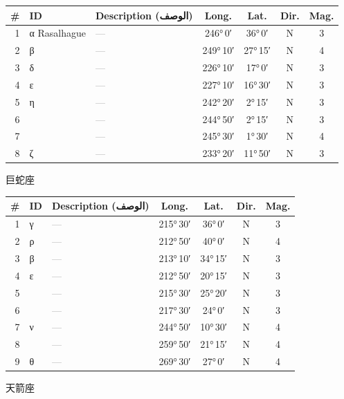 \documentclass[9pt,a4paper]{extarticle}
\newcommand{\ar}[1]{{\arabicfont\textarabic{#1}}}
\begin{document}
\begin{longtable}{r l >{\raggedright\arraybackslash}p{6.7cm} c c c c}
\toprule \# & ID & Description (\ar{الوصف}) & Long. & Lat. & Dir. & Mag.\\ \midrule\endhead
1 & α Rasalhague & \textcolor{gray}{—} & 246°\,0′ & 36°\,0′ & N & 3\\
2 & β & \textcolor{gray}{—} & 249°\,10′ & 27°\,15′ & N & 4\\
3 & δ & \textcolor{gray}{—} & 226°\,10′ & 17°\,0′ & N & 3\\
4 & ε & \textcolor{gray}{—} & 227°\,10′ & 16°\,30′ & N & 3\\
5 & η & \textcolor{gray}{—} & 242°\,20′ & 2°\,15′ & N & 3\\
6 &  & \textcolor{gray}{—} & 244°\,50′ & 2°\,15′ & N & 3\\
7 &  & \textcolor{gray}{—} & 245°\,30′ & 1°\,30′ & N & 4\\
8 & ζ & \textcolor{gray}{—} & 233°\,20′ & 11°\,50′ & N & 3\\
\bottomrule\end{longtable}
\vspace{4pt}\quad\ar{الحية}\quad 巨蛇座
\begin{longtable}{r l >{\raggedright\arraybackslash}p{6.7cm} c c c c}
\toprule \# & ID & Description (\ar{الوصف}) & Long. & Lat. & Dir. & Mag.\\ \midrule\endhead
1 & γ & \textcolor{gray}{—} & 215°\,30′ & 36°\,0′ & N & 3\\
2 & ρ & \textcolor{gray}{—} & 212°\,50′ & 40°\,0′ & N & 4\\
3 & β & \textcolor{gray}{—} & 213°\,10′ & 34°\,15′ & N & 3\\
4 & ε & \textcolor{gray}{—} & 212°\,50′ & 20°\,15′ & N & 3\\
5 &  & \textcolor{gray}{—} & 215°\,30′ & 25°\,20′ & N & 3\\
6 &  & \textcolor{gray}{—} & 217°\,30′ & 24°\,0′ & N & 3\\
7 & ν & \textcolor{gray}{—} & 244°\,50′ & 10°\,30′ & N & 4\\
8 &  & \textcolor{gray}{—} & 259°\,50′ & 21°\,15′ & N & 4\\
9 & θ & \textcolor{gray}{—} & 269°\,30′ & 27°\,0′ & N & 4\\
\bottomrule\end{longtable}
\vspace{4pt}\quad\ar{السهم}\quad 天箭座
\end{document}
